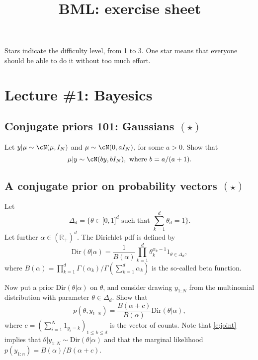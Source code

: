 \documentclass{article}
\title{BML: exercise sheet}
\date{}
\begin{document}
\maketitle

Stars indicate the difficulty level, from 1 to 3. One star means that everyone should be able to do it without too much effort.

\section{Lecture \#1: Bayesics}

\subsection{Conjugate priors 101: Gaussians $(\star)$}
\label{s:gaussianConjugacy}
Let $y\vert\mu \sim \cN(\mu,I_N)$ and $\mu\sim \cN(0,a I_N)$, for some $a>0$. Show that
\begin{equation}
  \mu\vert y \sim \cN(b y,bI_N), \text{ where } b=a/(a+1).
  \label{e:gaussianConjugacy}
\end{equation}

\subsection{A conjugate prior on probability vectors $(\star)$}
Let
$$
\Delta_d = \{\theta\in\mathbb[0,1]^d \text{ such that } \sum_{k=1}^d \theta_d = 1\}.
$$
Let further $\alpha\in(\mathbb{R}_+)^d$. The Dirichlet pdf is defined by
 $$
 \text{Dir}(\theta\vert \alpha) = \frac{1}{B(\alpha)} \prod_{k=1}^d \theta_k^{\alpha_k -1} 1_{\theta\in \Delta_d},$$
where
 $ B(\alpha) = \prod_{k=1}^d \Gamma(\alpha_k) / \Gamma(\sum_{k=1}^d \alpha_k)$
 is the so-called beta function.

 Now put a prior $\text{Dir}(\theta\vert \alpha)$ on $\theta$, and consider drawing $y_{1:N}$ from the multinomial distribution with parameter $\theta\in\Delta_d$. Show that
 \begin{equation}
   p(\theta, y_{1:N}) = \frac{B(\alpha+c)}{B(\alpha)} \text{Dir}(\theta\vert \alpha),
\label{e:joint}
 \end{equation}
 where $c=(\sum_{i=1}^N 1_{y_i=k})_{1\leq k \leq d}$ is the vector of counts. Note that \eqref{e:joint} implies that $\theta\vert y_{1:N} \sim \text{Dir}(\theta\vert \alpha)$ and that the marginal likelihood $p(y_{1:n}) = B(\alpha)/B(\alpha+c)$.
\end{document}
